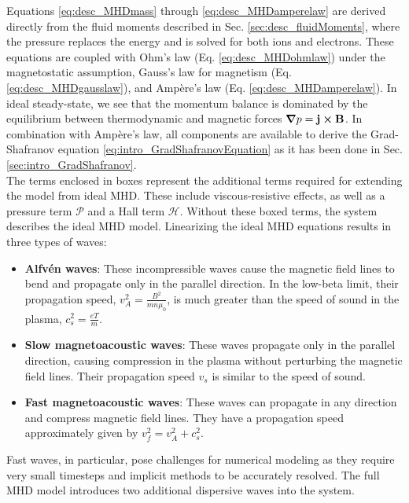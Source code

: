 Equations \ref{eq:desc_MHDmass} through \ref{eq:desc_MHDamperelaw} are derived directly from the fluid moments described in Sec. \ref{sec:desc_fluidMoments}, where the pressure replaces the energy and is solved for both ions and electrons. These equations are coupled with Ohm's law (Eq. \ref{eq:desc_MHDohmlaw}) under the magnetostatic assumption, Gauss's law for magnetism (Eq. \ref{eq:desc_MHDgausslaw}), and Ampère's law (Eq. \ref{eq:desc_MHDamperelaw}). In ideal steady-state, we see that the momentum balance is dominated by the equilibrium between thermodynamic and magnetic forces $\grad p = \mathbf{j}\cross\mathbf{B}$. In combination with Ampère's law, all components are available to derive the Grad-Shafranov equation \ref{eq:intro_GradShafranovEquation} as it has been done in Sec. \ref{sec:intro_GradShafranov}. \\
The terms enclosed in boxes represent the additional terms required for extending the model from ideal MHD. These include viscous-resistive effects, as well as a pressure term $\bm{\mathcal{P}}$ and a Hall term $\bm{\mathcal{H}}$. Without these boxed terms, the system describes the ideal MHD model. Linearizing the ideal MHD equations results in three types of waves:
\begin{itemize}
	\item \textbf{Alfvén waves}: These incompressible waves cause the magnetic field lines to bend and propagate only in the parallel direction. In the low-beta limit, their propagation speed, $v_A^2 = \frac{B^2}{mn\mu_0}$, is much greater than the speed of sound in the plasma, $c_s^2 = \frac{eT}{m}$.
	\item \textbf{Slow magnetoacoustic waves}: These waves propagate only in the parallel direction, causing compression in the plasma without perturbing the magnetic field lines. Their propagation speed $v_s$ is similar to the speed of sound.
	\item \textbf{Fast magnetoacoustic waves}: These waves can propagate in any direction and compress magnetic field lines. They have a propagation speed approximately given by $v_f^2 = v_A^2 + c_s^2$.
\end{itemize}

Fast waves, in particular, pose challenges for numerical modeling as they require very small timesteps and implicit methods to be accurately resolved. The full MHD model introduces two additional dispersive waves into the system.


